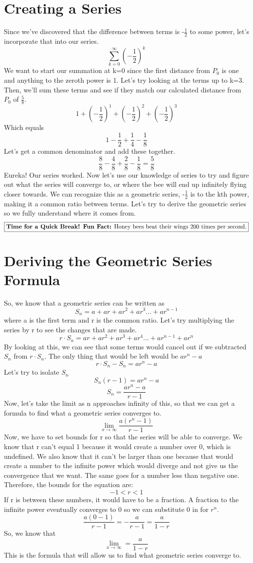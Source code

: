 \documentclass[a4paper,openright, 14pt]{article}
\begin{document}
\section*{Creating a Series}
Since we've discovered that the difference between terms is -$\frac{1}{2}$ to some power, let's incorporate that into our series.
$$\sum\limits_{k=0}^{\infty} (-\frac{1}{2})^k$$
We want to start our summation at k=0 since the first distance from $P_0$ is one and anything to the zeroth power is 1. Let's try looking at the terms up to k=3. Then, we'll sum these terms and see if they match our calculated distance from $P_0$ of $\frac{5}{8}$. 
$$1+(-\frac{1}{2})^1+(-\frac{1}{2})^2+(-\frac{1}{2})^3$$
Which equals
$$1-\frac{1}{2}+\frac{1}{4}-\frac{1}{8}$$
Let's get a common denominator and add these together.
$$\frac{8}{8}-\frac{4}{8}+\frac{2}{8}-\frac{1}{8}=\frac{5}{8}$$
Eureka! Our series worked. Now let's use our knowledge of series to try and figure out what the series will converge to, or where the bee will end up infinitely flying closer towards. We can recognize this as a geometric series, -$\frac{1}{2}$ is to the kth power, making it a common ratio between terms. Let's try to derive the geometric series so we fully understand where it comes from.
$$\fbox{\textbf{Time for a Quick Break! Fun Fact:} Honey bees beat their wings 200 times per second.}$$
\section*{Deriving the Geometric Series Formula}
So, we know that a geometric series can be written as 
$$S_n=a+ar+ar^2+ar^3...+ar^{n-1}$$
where a is the first term and r is the common ratio. Let's try multiplying the series by r to see the changes that are made.
$$r\cdot S_n=ar+ar^2+ar^3+ar^4...+ar^{n-1}+ar^{n}$$
By looking at this, we can see that some terms would cancel out if we subtracted $S_n$ from $r\cdot S_n$. The only thing that would be left would be $ar^n-a$
$$r\cdot S_n-S_n=ar^n-a$$
Let's try to isolate $S_n$
$$S_n(r-1)=ar^n-a$$
$$S_n=\frac{ar^n-a}{r-1}$$
Now, let's take the limit as n approaches infinity of this, so that we can get a formula to find what a geometric series converges to.
$$\lim_{x\to\infty} \frac{a(r^n-1)}{r-1}$$
Now, we have to set bounds for r so that the series will be able to converge. We know that r can't equal 1 because it would create a number over 0, which is undefined. We also know that it can't be larger than one because that would create a number to the infinite power which would diverge and not give us the convergence that we want. The same goes for a number less than negative one. Therefore, the bounds for the equation are:
$$-1<r<1$$
If r is between these numbers, it would have to be a fraction. A fraction to the infinite power eventually converges to 0 so we can substitute 0 in for $r^n$.
$$\frac{a(0-1)}{r-1}=-\frac{a}{r-1}=\frac{a}{1-r}$$
So, we know that
$$\lim_{x\to\infty} =\frac{a}{1-r}$$
This is the formula that will allow us to find what geometric series converge to.
\end{document}
